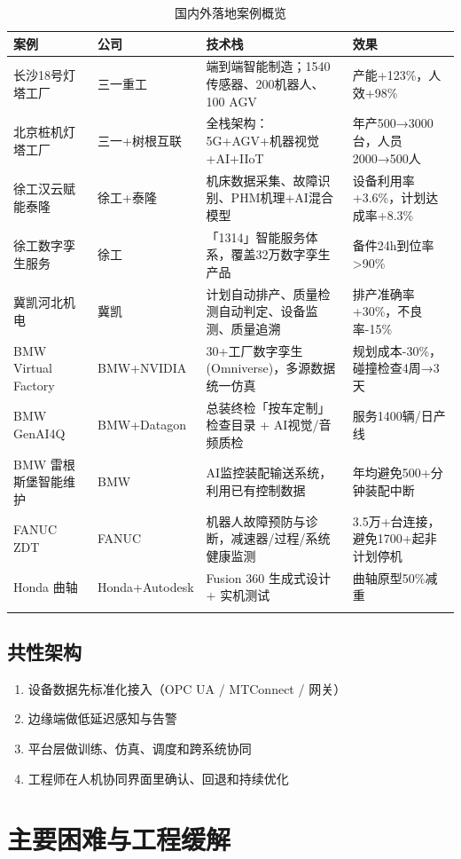 \documentclass[a4paper,12pt]{ctexart}
\begin{document}
\begin{longtable}{p{2.5cm}p{3cm}p{5.5cm}p{3.5cm}}
\toprule
\textbf{案例} & \textbf{公司} & \textbf{技术栈} & \textbf{效果} \\
\midrule
\endhead
长沙18号灯塔工厂 & 三一重工 & 端到端智能制造；1540传感器、200机器人、100 AGV & 产能+123\%，人效+98\% \\
北京桩机灯塔工厂 & 三一+树根互联 & 全栈架构：5G+AGV+机器视觉+AI+IIoT & 年产500→3000台，人员2000→500人 \\
徐工汉云赋能泰隆 & 徐工+泰隆 & 机床数据采集、故障识别、PHM机理+AI混合模型 & 设备利用率+3.6\%，计划达成率+8.3\% \\
徐工数字孪生服务 & 徐工 & 「1314」智能服务体系，覆盖32万数字孪生产品 & 备件24h到位率>90\% \\
冀凯河北机电 & 冀凯 & 计划自动排产、质量检测自动判定、设备监测、质量追溯 & 排产准确率+30\%，不良率-15\% \\
BMW Virtual Factory & BMW+NVIDIA & 30+工厂数字孪生(Omniverse)，多源数据统一仿真 & 规划成本-30\%，碰撞检查4周→3天 \\
BMW GenAI4Q & BMW+Datagon & 总装终检「按车定制」检查目录 + AI视觉/音频质检 & 服务1400辆/日产线 \\
BMW 雷根斯堡智能维护 & BMW & AI监控装配输送系统，利用已有控制数据 & 年均避免500+分钟装配中断 \\
FANUC ZDT & FANUC & 机器人故障预防与诊断，减速器/过程/系统健康监测 & 3.5万+台连接，避免1700+起非计划停机 \\
Honda 曲轴 & Honda+Autodesk & Fusion 360 生成式设计 + 实机测试 & 曲轴原型50\%减重 \\
\bottomrule
\caption{国内外落地案例概览}
\end{longtable}

\subsection{共性架构}

\begin{enumerate}
\item 设备数据先标准化接入（OPC UA / MTConnect / 网关）
\item 边缘端做低延迟感知与告警
\item 平台层做训练、仿真、调度和跨系统协同
\item 工程师在人机协同界面里确认、回退和持续优化
\end{enumerate}

\section{主要困难与工程缓解}
\end{document}
